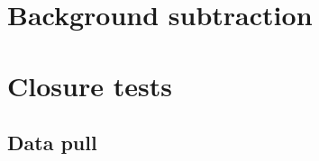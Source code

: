\section{Background subtraction}\label{sec:bkgdSubtraction}

% 
% 
% 
% 
% 
% 
% 
% 

\section{Closure tests}\label{sec:closureTests}
\subsection{Data pull}

